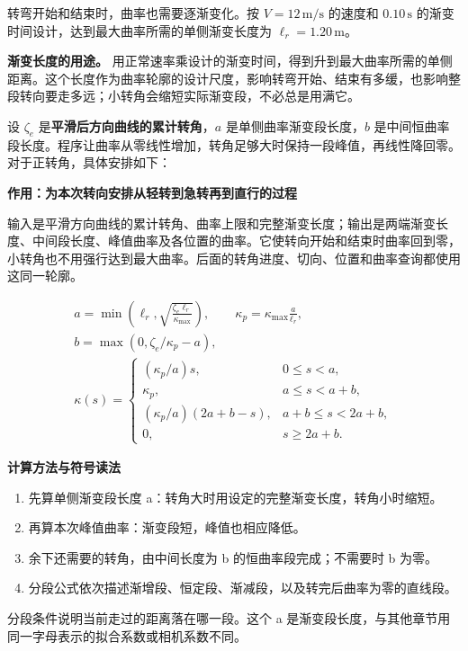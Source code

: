 \documentclass[12pt,a4paper]{article}
\numberwithin{equation}{topic}
\begin{document}
转弯开始和结束时，曲率也需要逐渐变化。按 \(V=12\,\mathrm{m/s}\) 的速度和 \(0.10\,\mathrm s\) 的渐变时间设计，达到最大曲率所需的单侧渐变长度为 \(\ell_r=1.20\,\mathrm m\)。

\textbf{渐变长度的用途。} 用正常速率乘设计的渐变时间，得到升到最大曲率所需的单侧距离。这个长度作为曲率轮廓的设计尺度，影响转弯开始、结束有多缓，也影响整段转向要走多远；小转角会缩短实际渐变段，不必总是用满它。

设 \(\zeta_e\) 是\textbf{平滑后方向曲线的累计转角}，\(a\) 是单侧曲率渐变段长度，\(b\) 是中间恒曲率段长度。程序让曲率从零线性增加，转角足够大时保持一段峰值，再线性降回零。对于正转角，具体安排如下：

\noindent\textbf{作用：为本次转向安排从轻转到急转再到直行的过程}\par\nobreak
输入是平滑方向曲线的累计转角、曲率上限和完整渐变长度；输出是两端渐变长度、中间段长度、峰值曲率及各位置的曲率。它使转向开始和结束时曲率回到零，小转角也不用强行达到最大曲率。后面的转角进度、切向、位置和曲率查询都使用这同一轮廓。

\begin{equation}
\label{eq:profile}
\begin{gathered}
a=\min\!\left(\ell_r,\sqrt{\frac{\zeta_e\ell_r}{\kappa_{\max}}}\right),
\qquad
\kappa_p=\kappa_{\max}\frac{a}{\ell_r},
\qquad\\
b=\max(0,\zeta_e/\kappa_p-a),\\[3pt]
\kappa(s)=
\begin{cases}
(\kappa_p/a)s,&0\le s<a,\\
\kappa_p,&a\le s<a+b,\\
(\kappa_p/a)(2a+b-s),&a+b\le s<2a+b,\\
0,&s\ge 2a+b.
\end{cases}
\end{gathered}
\end{equation}

\noindent\textbf{计算方法与符号读法}\par\nobreak
\begin{enumerate}
\item 先算单侧渐变段长度 a：转角大时用设定的完整渐变长度，转角小时缩短。
\item 再算本次峰值曲率：渐变段短，峰值也相应降低。
\item 余下还需要的转角，由中间长度为 b 的恒曲率段完成；不需要时 b 为零。
\item 分段公式依次描述渐增段、恒定段、渐减段，以及转完后曲率为零的直线段。
\end{enumerate}
分段条件说明当前走过的距离落在哪一段。这个 a 是渐变段长度，与其他章节用同一字母表示的拟合系数或相机系数不同。
\end{document}
